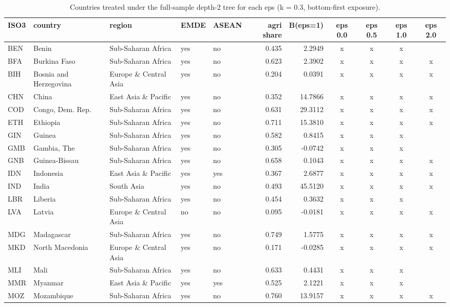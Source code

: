 \begin{table}[htbp]
\centering
\caption{Countries treated under the full-sample depth-2 tree for each eps (k = 0.3, bottom-first exposure).}
\label{tab:agri_treated}
\begin{tabular}{lllllrrcccc}
\toprule
ISO3 & country & region & EMDE & ASEAN & agri share & B(eps=1) & eps 0.0 & eps 0.5 & eps 1.0 & eps 2.0 \\
\midrule
BEN & Benin & Sub-Saharan Africa & yes & no & 0.435 & 2.2949 & x & x & x &  \\
BFA & Burkina Faso & Sub-Saharan Africa & yes & no & 0.623 & 2.3902 & x & x & x & x \\
BIH & Bosnia and Herzegovina & Europe \& Central Asia & yes & no & 0.204 & 0.0391 & x & x & x & x \\
CHN & China & East Asia \& Pacific & yes & no & 0.352 & 14.7866 & x & x & x & x \\
COD & Congo, Dem. Rep. & Sub-Saharan Africa & yes & no & 0.631 & 29.3112 & x & x & x & x \\
ETH & Ethiopia & Sub-Saharan Africa & yes & no & 0.711 & 15.3810 & x & x & x & x \\
GIN & Guinea & Sub-Saharan Africa & yes & no & 0.582 & 0.8415 & x & x & x &  \\
GMB & Gambia, The & Sub-Saharan Africa & yes & no & 0.305 & -0.0742 & x & x & x &  \\
GNB & Guinea-Bissau & Sub-Saharan Africa & yes & no & 0.658 & 0.1043 & x & x & x & x \\
IDN & Indonesia & East Asia \& Pacific & yes & yes & 0.367 & 2.6877 & x & x & x & x \\
IND & India & South Asia & yes & no & 0.493 & 45.5120 & x & x & x & x \\
LBR & Liberia & Sub-Saharan Africa & yes & no & 0.454 & 0.3632 & x & x & x &  \\
LVA & Latvia & Europe \& Central Asia & no & no & 0.095 & -0.0181 & x & x & x & x \\
MDG & Madagascar & Sub-Saharan Africa & yes & no & 0.749 & 1.5775 & x & x & x & x \\
MKD & North Macedonia & Europe \& Central Asia & yes & no & 0.171 & -0.0285 & x & x & x & x \\
MLI & Mali & Sub-Saharan Africa & yes & no & 0.633 & 0.4431 & x & x & x &  \\
MMR & Myanmar & East Asia \& Pacific & yes & yes & 0.525 & 2.1221 & x & x & x &  \\
MOZ & Mozambique & Sub-Saharan Africa & yes & no & 0.760 & 13.9157 & x & x & x & x \\

\end{tabular}
\end{table}
